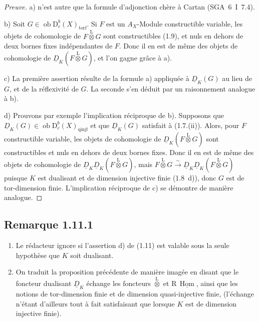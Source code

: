 \documentclass[11pt]{article}
\DeclareMathOperator{\Hom}{Hom}
\newcommand{\R}{\mathrm{R}}
\newcommand{\D}{\mathrm{D}}
\newcommand{\ob}{\operatorname{ob}}
\providecommand{\Hom}{\operatorname{Hom}}
\providecommand{\ob}{\operatorname{ob}}
\begin{document}
\begin{proof}[Preuve]
a) n'est autre que la formule d'adjonction chère à Cartan (SGA~6~I~7.4).

b) Soit $G \in \ob \D_c^{b}(X)_{\mathrm{torf}}$. Si $F$ est un $A_X$-Module constructible variable, les objets de cohomologie de $F \mathop{\otimes}\limits^{\mathrm{L}} G$ sont constructibles (1.9), et nuls en dehors de deux bornes fixes indépendantes de $F$. Donc il en est de même des objets de cohomologie de $\underline{D}_K(F \mathop{\otimes}\limits^{\mathrm{L}} G)$, et l'on gagne grâce à a).

c) La première assertion résulte de la formule a) appliquée à $\underline{D}_K(G)$ au lieu de $G$, et de la réflexivité de $G$. La seconde s'en déduit par un raisonnement analogue à b).

d) Prouvons par exemple l'implication réciproque de b). Supposons que $\underline{D}_K(G) \in \ob \D_c^{b}(X)_{\mathrm{qinjf}}$ et que $\underline{D}_K(G)$ satisfait à (1.7.(ii)). Alors, pour $F$ constructible variable, les objets de cohomologie de $\underline{D}_K(F \mathop{\otimes}\limits^{\mathrm{L}} G)$ sont constructibles et nuls en dehors de deux bornes fixes. Donc il en est de même des objets de cohomologie de $\underline{D}_K \underline{D}_K(F \mathop{\otimes}\limits^{\mathrm{L}} G)$, mais $F \mathop{\otimes}\limits^{\mathrm{L}} G \xrightarrow{\sim} \underline{D}_K \underline{D}_K(F \mathop{\otimes}\limits^{\mathrm{L}} G)$ puisque $K$ est dualisant et de dimension injective finie (1.8~d)), donc $G$ est de tor-dimension finie. L'implication réciproque de c) se démontre de manière analogue.
\end{proof}

\subsection*{Remarque 1.11.1}
\begin{enumerate}
\item[a)] Le rédacteur ignore si l'assertion d) de (1.11) est valable sous la seule hypothèse que $K$ soit dualisant.
\item[b)] On traduit la proposition précédente de manière imagée en disant que le foncteur dualisant $\underline{D}_K$ échange les foncteurs $\mathop{\otimes}\limits^{\mathrm{L}}$ et $\R\,\underline{\Hom}$, ainsi que les notions de tor-dimension finie et de dimension quasi-injective finie, (l'échange n'étant d'ailleurs tout à fait satisfaisant que lorsque $K$ est de dimension injective finie).
\end{enumerate}
\end{document}
